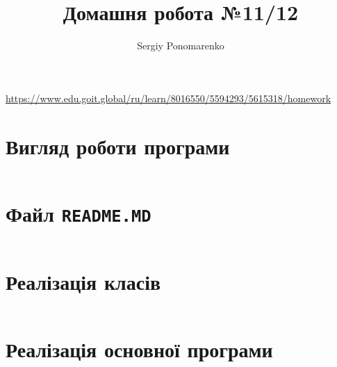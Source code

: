 \documentclass[14pt]{extarticle}
\title{Домашня робота №11/12}
\author{Sergiy Ponomarenko}
\begin{document}
\maketitle

\begin{center}\scriptsize
	\url{https://www.edu.goit.global/ru/learn/8016550/5594293/5615318/homework}
\end{center}

\section{Вигляд роботи програми}


\begin{center}
	\inputminted[fontsize=\scriptsize]{text}{primer.txt}
\end{center}


\section{Файл \texttt{README.MD}}

\inputminted[fontsize=\scriptsize,%
	numbersep = 1pt,%
	breaklines=true,%
	framesep=1mm,%
	baselinestretch=0.95,%
	bgcolor=gray!5,%
	fontsize=\scriptsize,%
	linenos]{text}{readme.md}

\section{Реалізація класів}

\inputminted[fontsize=\scriptsize,%
	numbersep = 1pt,%
	breaklines=true,%
	framesep=1mm,%
	baselinestretch=0.95,%
	bgcolor=gray!5,%
	fontsize=\footnotesize,%
	linenos]{python}{botmodule.py}

\section{Реалізація основної програми}

\inputminted[fontsize=\scriptsize,%
	numbersep = 1pt,%
	breaklines=true,%
	framesep=1mm,%
	baselinestretch=0.95,%
	bgcolor=gray!5,%
	fontsize=\footnotesize,%
	linenos]{python}{main.py}
\end{document}
